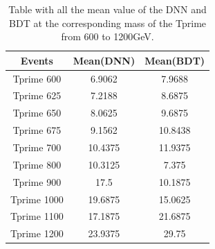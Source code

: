 \begin{table}[H]
    \centering
    \begin{tabular}{c|c|c}\hline
     Events    & Mean(DNN)  & Mean(BDT)  \\\hline
     Tprime 600    &  6.9062  & 7.9688 \\
     Tprime 625 & 7.2188     &  8.6875  \\
     Tprime 650 & 8.0625  &   9.6875   \\
     Tprime 675 & 9.1562  & 10.8438 \\
     Tprime 700 & 10.4375 & 11.9375 \\
     Tprime 800 & 10.3125 & 7.375  \\
     Tprime 900 & 17.5 & 10.1875   \\
     Tprime 1000 & 19.6875 & 15.0625 \\
     Tprime 1100 & 17.1875 & 21.6875 \\
     Tprime 1200 & 23.9375 & 29.75 \\\hline
    \end{tabular}
    \caption{Table with all the mean value of the DNN and BDT at the corresponding mass of the Tprime from 600 to 1200GeV.}
    \label{tab:my_label_Comparision_BDT_DNN}
\end{table}








